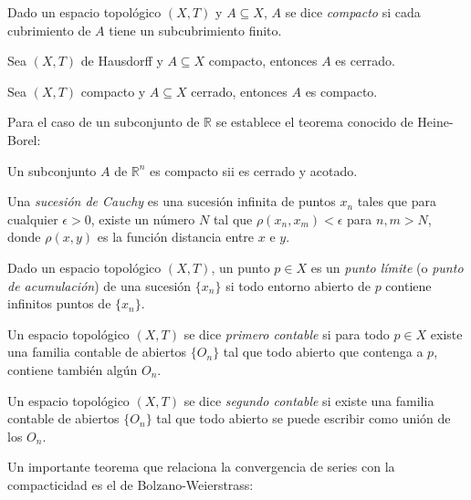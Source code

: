 \begin{definition}
Dado un espacio topológico $(X,T)$  y $A\subseteq X$, $A$ se dice \textit{compacto} si cada cubrimiento de $A$ tiene un subcubrimiento finito.
\end{definition}

\begin{theorem}
Sea $(X,T)$ de Hausdorff y $A\subseteq X$ compacto, entonces $A$ es cerrado.
\end{theorem}

\begin{theorem}
Sea $(X,T)$ compacto y $A\subseteq X$ cerrado, entonces $A$ es compacto.
\end{theorem}

Para el caso de un subconjunto de $\mathbb{R}$ se establece el teorema conocido de Heine-Borel:

\begin{theorem}
Un subconjunto $A$ de $\mathbb{R}^n$ es compacto sii es cerrado y acotado.
\end{theorem}

\begin{definition}
Una \textit{sucesión de Cauchy} es una sucesión infinita de puntos $x_n$ tales que para cualquier $\epsilon>0$, existe un número $N$ tal que $\rho(x_n,x_m)<\epsilon$ para $n,m>N$, donde $\rho(x,y)$ es la función distancia entre $x$ e $y$.
\end{definition}

\begin{definition}
Dado un espacio topológico $(X,T)$, un punto $p\in X$ es un \textit{punto límite} (o \textit{punto de acumulación}) de una sucesión $\{x_n\}$ si todo entorno abierto de $p$ contiene infinitos puntos de $\{x_n\}$.
\end{definition}

\begin{definition}
Un espacio topológico $(X,T)$ se dice \textit{primero contable} si para todo $p\in X$ existe una familia contable de abiertos $\{O_n\}$ tal que todo abierto que contenga a $p$, contiene también algún $O_n$.
\end{definition}

\begin{definition}
Un espacio topológico $(X,T)$ se dice \textit{segundo contable} si existe una familia contable de abiertos $\{O_n\}$  tal que todo abierto se puede escribir como unión de los $O_n$.
\end{definition}

Un importante teorema que relaciona la convergencia de series con la compacticidad es el de Bolzano-Weierstrass:

